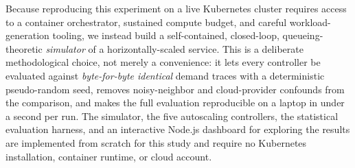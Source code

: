 \documentclass[conference]{IEEEtran}
\begin{document}
Because reproducing this experiment on a live Kubernetes cluster requires access to a container
orchestrator, sustained compute budget, and careful workload-generation tooling, we instead build a
self-contained, closed-loop, queueing-theoretic \emph{simulator} of a horizontally-scaled service.
This is a deliberate methodological choice, not merely a convenience: it lets every controller be
evaluated against \emph{byte-for-byte identical} demand traces with a deterministic pseudo-random
seed, removes noisy-neighbor and cloud-provider confounds from the comparison, and makes the full
evaluation reproducible on a laptop in under a second per run. The simulator, the five autoscaling
controllers, the statistical evaluation harness, and an interactive Node.js dashboard for exploring the
results are
implemented from scratch for this study and require no Kubernetes installation, container runtime, or
cloud account.
\end{document}
